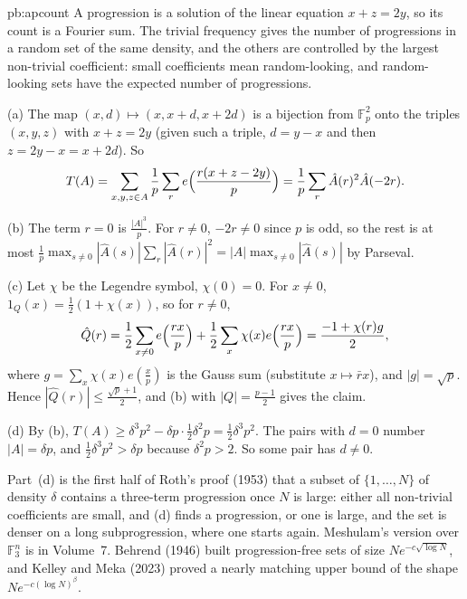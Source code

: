 \begin{solution}{pb:apcount}
\idea A progression is a solution of the linear equation $x+z=2y$, so its count is a Fourier sum. The trivial frequency gives the
number of progressions in a random set of the same density, and the others are controlled by the largest non-trivial
coefficient: small coefficients mean random-looking, and random-looking sets have the expected number of progressions.

\writeup (a) The map $(x,d)\mapsto(x,x+d,x+2d)$ is a bijection from $\mathbb F_p^2$ onto the triples $(x,y,z)$ with $x+z=2y$ (given such a triple,
$d=y-x$ and then $z=2y-x=x+2d$). So
\[
T(A)=\sum_{x,y,z\in A}\frac1p\sum_re\Bigl(\frac{r(x+z-2y)}p\Bigr)=\frac1p\sum_r\hat A(r)^2\hat A(-2r).
\]

(b) The term $r=0$ is $\frac{|A|^3}p$. For $r\ne0$, $-2r\ne0$ since $p$ is odd, so the rest is at most
$\frac1p\max_{s\ne0}|\hat A(s)|\sum_r|\hat A(r)|^2=|A|\max_{s\ne0}|\hat A(s)|$ by Parseval.

(c) Let $\chi$ be the Legendre symbol, $\chi(0)=0$. For $x\ne0$, $1_Q(x)=\frac12(1+\chi(x))$, so for $r\ne0$,
\[
\hat Q(r)=\frac12\sum_{x\ne0}e\Bigl(\frac{rx}p\Bigr)+\frac12\sum_x\chi(x)e\Bigl(\frac{rx}p\Bigr)=\frac{-1+\chi(r)g}2,
\]
where $g=\sum_x\chi(x)e(\frac xp)$ is the Gauss sum (substitute $x\mapsto\bar rx$), and $|g|=\sqrt p$. Hence $|\hat Q(r)|\le\frac{\sqrt p+1}2$, and (b) with
$|Q|=\frac{p-1}2$ gives the claim.

(d) By (b), $T(A)\ge\delta^3p^2-\delta p\cdot\frac12\delta^2p=\frac12\delta^3p^2$. The pairs with $d=0$ number $|A|=\delta p$, and $\frac12\delta^3p^2>\delta p$ because
$\delta^2p>2$. So some pair has $d\ne0$.

\leads Part~(d) is the first half of Roth's proof (1953) that a subset of $\{1,\dots,N\}$ of density $\delta$ contains a three-term
progression once $N$ is large: either all non-trivial coefficients are small, and (d) finds a progression, or one is large, and
the set is denser on a long subprogression, where one starts again. Meshulam's version over $\mathbb F_3^n$ is in Volume~7. Behrend (1946)
built progression-free sets of size $Ne^{-c\sqrt{\log N}}$, and Kelley and Meka (2023) proved a nearly matching upper bound of the
shape $Ne^{-c(\log N)^\beta}$.
\end{solution}

